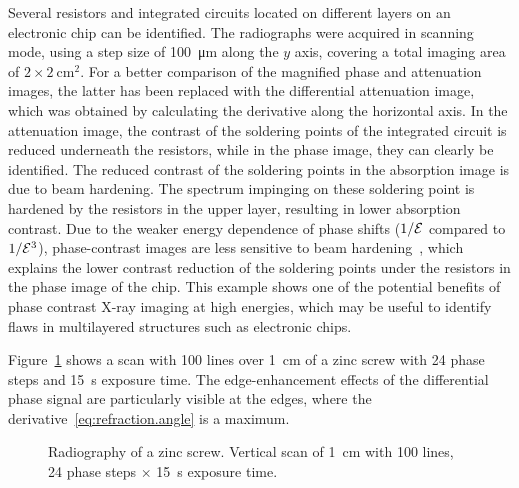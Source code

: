 Several resistors and integrated circuits located on different
layers on an electronic chip can be identified. The radiographs were acquired in scanning
mode, using a step size of \SI{100}{\micro\metre} along the $y$ axis, covering a total imaging
area of $2 \times \SI{2}{\centi\metre^2}$. For a better comparison of the magnified phase and
attenuation images, the latter has been replaced with the differential
attenuation image, which was obtained by calculating the derivative along
the horizontal axis. In the attenuation image, the contrast of the soldering
points of the integrated circuit is reduced underneath the resistors, while
in the phase image, they can clearly be identified. The reduced contrast of
the soldering points in the absorption image is due to beam hardening. The
spectrum impinging on these soldering point is hardened by the resistors in
the upper layer, resulting in lower absorption contrast. Due to the weaker
energy dependence of phase shifts ($1/\mathcal{E}$ compared to $1/\mathcal{E}^3$), phase-contrast
images are less sensitive to beam hardening~\cite{Chabior2011a}, which explains the lower
contrast reduction of the soldering points under the resistors in the
phase image of the chip. This example shows one of the potential benefits of
phase contrast X-ray imaging at high energies, which may be useful to
identify flaws in multilayered structures such as electronic chips.

Figure~\ref{fig:screw} shows a scan with \num{100} lines over
\SI{1}{\centi\metre} of a zinc screw
with \num{24} phase steps and \SI{15}{\second} exposure time.
The edge-enhancement effects of the differential phase signal are
particularly visible at the edges, where the
derivative~\eqref{eq:refraction.angle} is a maximum.

\begin{figure}[hbt]
    \centering
    
    \caption[Radiography of a zinc screw.]{Radiography of a zinc screw.
        Vertical scan of \SI{1}{\centi\metre} with \num{100} lines,
        \num{24} phase steps $\times$ \SI{15}{\second} exposure time.}
    \label{fig:screw}
\end{figure}

